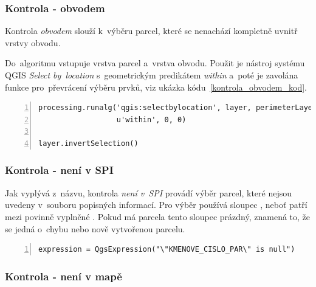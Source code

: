 \subsubsection{Kontrola - obvodem}
\label{kontrola_obvodem}

Kontrola \textit{obvodem} slouží k~výběru parcel, které se nenachází
kompletně uvnitř vrstvy obvodu.

Do~algoritmu vstupuje vrstva parcel a~vrstva obvodu. Použit je nástroj
systému QGIS \textit{Select by~location} s~geometrickým predikátem
\textit{within} a~poté je zavolána funkce pro~převrácení výběru prvků,
viz ukázka kódu~\ref{kontrola_obvodem_kod}.

{\scriptsize
\begin{lstlisting}[style=python, caption={Kontrola \textit{obvodem}~–
výběr prvků}, captionpos=b, label=kontrola_obvodem_kod,
backgroundcolor = \color{light-gray}, numbers=left]
processing.runalg('qgis:selectbylocation', layer, perimeterLayer,
                  u'within', 0, 0)

layer.invertSelection()
\end{lstlisting}}

\subsubsection{Kontrola - není v SPI}
\label{kontrola_neni_v_spi}

Jak vyplývá z~názvu, kontrola \textit{není v~SPI} provádí výběr
parcel, které nejsou uvedeny v~souboru popisných informací. Pro výběr
používá sloupec \texttt{}, neboť patří
mezi povinně vyplněné \citep{struktura_vfk}. Pokud má parcela tento
sloupec prázdný, znamená to, že se jedná o~chybu nebo nově vytvořenou
parcelu.

{\scriptsize
\begin{lstlisting}[style=python, caption={Kontrola \textit{není
v~SPI}~– vzorec pro~výběr prvků}, captionpos=b,
label=kontrola_spi_kod, backgroundcolor = \color{light-gray},
numbers=left]
expression = QgsExpression("\"KMENOVE_CISLO_PAR\" is null")
\end{lstlisting}}

\subsubsection{Kontrola - není v mapě}
\label{kontrola_neni_v_mape}

